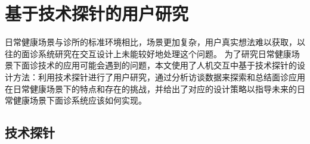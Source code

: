 \chapter{基于技术探针的用户研究}

日常健康场景与诊所的标准环境相比，场景更加复杂，用户真实想法难以获取，以往的面诊系统研究在交互设计上未能较好地处理这个问题。
为了研究日常健康场景下面诊技术的应用可能会遇到的问题，本文使用了人机交互中基于技术探针的设计方法：利用技术探针进行了用户研究，通过分析访谈数据来探索和总结面诊应用在日常健康场景下的特点和存在的挑战，并给出了对应的设计策略以指导未来的日常健康场景下面诊系统应该如何实现。

\section{技术探针}
\label{sec:diagnose_model}

%


%

